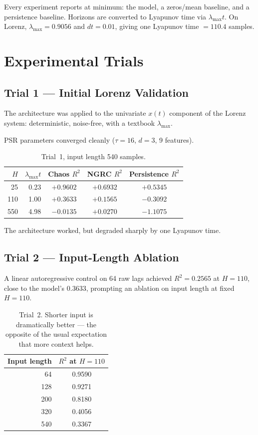 \documentclass[11pt,a4paper]{article}
\begin{document}
Every experiment reports at minimum: the model, a zeros/mean baseline, and a persistence baseline.
Horizons are converted to Lyapunov time via $\lambda_{\max} t$.
On Lorenz, $\lambda_{\max} = 0.9056$ and $dt = 0.01$, giving one Lyapunov time $= 110.4$ samples.


\section{Experimental Trials}

\subsection{Trial 1 --- Initial Lorenz Validation}

The architecture was applied to the univariate $x(t)$ component of the Lorenz system: deterministic, noise-free, with a textbook $\lambda_{\max}$.

PSR parameters converged cleanly ($\tau = 16$, $d = 3$, 9 features).

\begin{table}[H]
\centering
\caption{Trial~1, input length 540 samples.}
\begin{tabular}{rr|c|c|c}
\toprule
$H$ & $\lambda_{\max} t$ & Chaos $R^2$ & NGRC $R^2$ & Persistence $R^2$ \\
\midrule
25  & 0.23 & $+0.9602$ & $+0.6932$ & $+0.5345$ \\
110 & 1.00 & $+0.3633$ & $+0.1565$ & $-0.3092$ \\
550 & 4.98 & $-0.0135$ & $+0.0270$ & $-1.1075$ \\
\bottomrule
\end{tabular}
\end{table}

The architecture worked, but degraded sharply by one Lyapunov time.


\subsection{Trial 2 --- Input-Length Ablation}

A linear autoregressive control on 64 raw lags achieved $R^2 = 0.2565$ at $H = 110$, close to the model's 0.3633, prompting an ablation on input length at fixed $H = 110$.

\begin{table}[H]
\centering
\caption{Trial~2. Shorter input is dramatically better --- the opposite of the usual expectation that more context helps.}
\begin{tabular}{rc}
\toprule
\textbf{Input length} & $R^2$ \textbf{at} $H = 110$ \\
\midrule
64  & 0.9590 \\
128 & 0.9271 \\
200 & 0.8180 \\
320 & 0.4056 \\
540 & 0.3367 \\
\bottomrule
\end{tabular}
\end{table}
\end{document}
